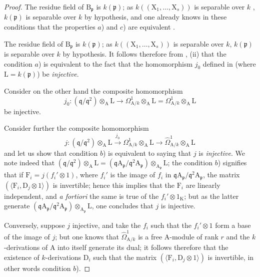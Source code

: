 \begin{proof}
The residue field of $\mathrm{B}_\mathfrak{p}$ is $k(\mathfrak{p})$; as $k((\mathrm{X}_1,\ldots,\mathrm{X}_s))$ is separable over $k$ , $k(\mathfrak{p})$ is separable over $k$ by hypothesis, and one already knows in these conditions that the properties $a$) and $c$) are equivalent .

The residue field of $\mathrm{B}_\mathfrak{p}$ is $k(\mathfrak{p})$; as $k((\mathrm{X}_1,\ldots,\mathrm{X}_s))$ is separable over $k$, $k(\mathfrak{p})$ is separable over $k$ by hypothesis. It follows therefore from , (ii) that the condition $a$) is equivalent to the fact that the homomorphism $j_0$ defined in  (where $\mathrm{L}=k(\mathfrak{p})$) be \emph{injective}.

Consider on the other hand the composite homomorphism
\[
\label{0.22.7.2.1}
  j_0:(\mathfrak{q}/\mathfrak{q}^2)\otimes_\mathrm{A}\mathrm{L}\to\Omega^1_{\mathrm{A}/k}\otimes_\mathrm{A}\mathrm{L}=\Omega^1_{\mathrm{A}/k}\otimes_\mathrm{A}\mathrm{L}
  \tag{22.7.2.1}
\]
be injective.

Consider further the composite homomorphism
\[
\label{0.22.7.2.2}
  j:(\mathfrak{q}/\mathfrak{q}^2)\otimes_\mathrm{A}\mathrm{L}\xrightarrow{j_0}\Omega^1_{\mathrm{A}/k}\otimes_\mathrm{A}\mathrm{L}\to\widehat{\Omega}^1_{\mathrm{A}/k}\otimes_\mathrm{A}\mathrm{L}
  \tag{22.7.2.2}
\]
and let us show that condition $b$) is equivalent to saying that $j$ is \emph{injective}.
We note indeed that $(\mathfrak{q}/\mathfrak{q}^2)\otimes_\mathrm{A}\mathrm{L}=(\mathfrak{q}\mathrm{A}_\mathfrak{p}/\mathfrak{q}^2\mathrm{A}_\mathfrak{p})\otimes_{\mathrm{A}_\mathfrak{p}}\mathrm{L}$; the condition $b$) signifies that if $\mathrm{F}_i=j(f_i'\otimes 1)$, where $f_i'$ is the image of $f_i$ in $\mathfrak{q}\mathrm{A}_\mathfrak{p}/\mathfrak{q}^2\mathrm{A}_\mathfrak{p}$, the matrix $(\langle\mathrm{F}_i,\mathrm{D}_j\otimes 1\rangle)$ is invertible; hence this implies that the $\mathrm{F}_i$ are linearly independent, and \emph{a fortiori} the same is true of the $f_i'\otimes 1_\mathrm{K}$; but as the latter generate $(\mathfrak{q}\mathrm{A}_\mathfrak{p}/\mathfrak{q}^2\mathrm{A}_\mathfrak{p})\otimes_{\mathrm{A}_\mathfrak{p}}\mathrm{L}$, one concludes that $j$ is injective.

Conversely, suppose $j$ injective, and take the $f_i$ such that the $f_i'\otimes 1$ form a base of the image of $j$; but one knows  that $\widehat{\Omega}^1_{\mathrm{A}/k}$ is a free $\mathrm{A}$-module of rank $r$ and the $k$-derivations of $\mathrm{A}$ into itself generate its dual; it follows therefore that the existence of $k$-derivations $\mathrm{D}_i$ such that the matrix $(\langle\mathrm{F}_i,\mathrm{D}_j\otimes 1\rangle)$ is invertible, in other words condition $b$).


\end{proof}
